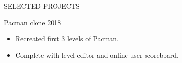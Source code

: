 \documentclass{resume}
\begin{document}
\begin{minipage}[t]{0.54\textwidth}
\begin{rsection}{\MakeUppercase{selected projects}}{}
\begin{rcontent}{\href{https://github.com/solomspd/pacman}{Pacman clone \hspace{0.25em} \iconin{\faGithub}}}{2018}{}{}
		\begin{techtag}
			\item {}
			\item {}
			\item {}
		\end{techtag}
			\begin{itemize}
				\item Recreated first 3 levels of Pacman.
				\item Complete with level editor and online user scoreboard.
			\end{itemize}
		\end{rcontent}

	\end{rsection}

\end{minipage}
\hfill
\end{document}
